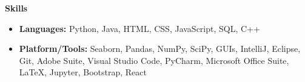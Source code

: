 \documentclass[letterpaper,8pt]{article}[leftmargin=*]
\def \entryspacing {-0pt}
\renewcommand{\section}[2]{\vspace{5pt}
  \colorbox{secondary}{\color{white}\raggedbottom\normalsize\textbf{{#1}{\hspace{7pt}#2}}}
}
\newcommand{\resumeEntryStart}{\begin{itemize}[leftmargin=2.5mm]}
\newcommand{\resumeEntryEnd}{\end{itemize}\vspace{\entryspacing}}
\newcommand{\resumeEntryS}[2]{
  \item[]\small{
    \textbf{\color{primary}#1 }{ #2 \vspace{-6pt}}
  }
}
\begin{document}
\section{\faGears}{Skills}
 \resumeEntryStart
  \resumeEntryS{Languages: } {Python, Java, HTML, CSS, JavaScript, SQL, C++}
  \resumeEntryS{Platform/Tools: } { Seaborn, Pandas, NumPy, SciPy, GUIs, IntelliJ, Eclipse, Git, Adobe Suite, Visual Studio Code, PyCharm, Microsoft Office Suite, LaTeX, Jupyter, Bootstrap, React}
 \resumeEntryEnd
\end{document}
